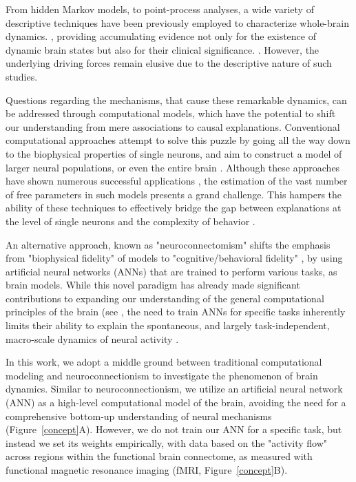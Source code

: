 \documentclass{article}
\begin{document}
From hidden Markov models, to point-process analyses, a wide variety of descriptive techniques have been previously
employed to characterize whole-brain dynamics. \citep{smith2012temporally, vidaurre2017brain, liu2013time, chen2018human},
providing accumulating evidence not only for the existence of dynamic brain states but also for their clinical
significance. \citep{hutchison2013dynamic, barttfeld2015signature, meer2020movie}.
However, the underlying driving forces remain elusive due to the descriptive nature of such studies.

Questions regarding the mechanisms, that cause these remarkable dynamics, can be addressed through computational models, which have the potential to shift our understanding from mere associations to causal
explanations.
Conventional computational approaches attempt to solve this puzzle by going all the way down to the biophysical properties
of single neurons, and aim to construct a model of larger neural populations, or even the entire brain
\citep{breakspear2017dynamic}.
Although these approaches have shown numerous successful applications \citep{murray2018biophysical, kriegeskorte2018cognitive, heinz2019towards},
the estimation of the vast number of free parameters in such models presents a grand challenge.
This hampers the ability of these techniques to effectively bridge the gap between explanations at the level of single
neurons and the complexity of behavior \citep{breakspear2017dynamic}.

An alternative approach, known as "neuroconnectomism" \citep{doerig2023neuroconnectionist} shifts the
emphasis from "biophysical fidelity" of models to "cognitive/behavioral fidelity"
\citep{kriegeskorte2018cognitive}, by using artificial neural networks (ANNs) that are trained to
perform various tasks, as brain models.
While this novel paradigm has already made significant contributions to expanding our understanding of the general
computational principles of the brain (see \citep{doerig2023neuroconnectionist}, the need to train ANNs for
specific tasks inherently limits their ability to explain the spontaneous, and largely task-independent, macro-scale
dynamics of neural activity \citep{richards2019deep}.

In this work, we adopt a middle ground between traditional computational modeling and neuroconnectionism to investigate
the phenomenon of brain dynamics.
Similar to neuroconnectionism, we utilize an artificial neural network (ANN) as a high-level computational model of the brain, avoiding the need for a comprehensive bottom-up understanding of neural mechanisms (Figure~\ref{concept}A).
However, we do not train our ANN for a specific task, but instead we set its weights empirically, with data based
on the "activity flow" \citep{cole2016activity, ito2017cognitive}
across regions within the functional brain connectome, as measured with functional magnetic resonance imaging
(fMRI, Figure~\ref{concept}B).
\end{document}

